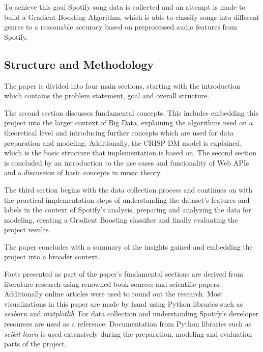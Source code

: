 To achieve this goal Spotify song data is collected and an attempt is made to build a Gradient Boosting
Algorithm, which is able to classify songs into different genres to a reasonable accuracy based on preprocessed
audio features from Spotify.

\subsection{Structure and Methodology}

The paper is divided into four main sections, starting with the introduction which contains the problem statement, goal and overall structure.

The second section discusses fundamental concepts. This includes embedding this project into the larger context of Big Data,
explaining the algorithms used on a theoretical level and introducing further concepts which are used for data preparation and modeling.
Additionally, the \ac{CRISP DM} model is explained, which is the basic structure that implementation is based on.
The second section is concluded by an introduction to the use cases and funcionality of Web \acp{API} and a discussion of basic concepts
in music theory.

The third section begins with the data collection process and continues on with the practical implementation steps 
of understanding the dataset's features and labels in the context of Spotify's analysis, preparing and analyzing the data for modeling, creating a
Gradient Boosting classifier and finally evaluating the project results.

The paper concludes with a summary of the insights gained and embedding the project into a broader context.

Facts presented as part of the paper's fundamental sections are derived from literature research using renowned book sources and
scientific papers. Additionally online articles were used to round out the research.
Most visualizations in this paper are made by hand using Python libraries such as \emph{seaborn} and \emph{matplotlib}.
For data collection and understanding Spotify's developer resources are used as a reference.
Documentation from Python libraries such as \emph{scikit learn} is used extensively during the preparation, modeling and evaluation parts
of the project.



